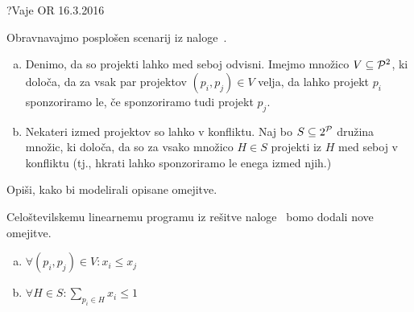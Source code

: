 \begin{naloga}{?}{Vaje OR 16.3.2016}
\begin{vprasanje}[proj2]
Obravnavajmo posplošen scenarij iz naloge~.
\begin{enumerate}[(a)]
\item Denimo, da so projekti lahko med seboj odvisni.
Imejmo množico $V \subseteq \mathcal{P}^2$, ki določa,
da za vsak par projektov $(p_i, p_j) \in V$ velja,
da lahko projekt $p_i$ sponzoriramo le,
če sponzoriramo tudi projekt $p_j$.

\item Nekateri izmed projektov so lahko v konfliktu.
Naj bo $S \subseteq 2^{\mathcal{P}}$ družina množic, ki določa,
da so za vsako množico $H \in S$ projekti iz $H$ med seboj v konfliktu
(tj., hkrati lahko sponzoriramo le enega izmed njih.)
\end{enumerate}
Opiši, kako bi modelirali opisane omejitve.
\end{vprasanje}

\begin{odgovor}
Celoštevilskemu linearnemu programu iz rešitve naloge~
bomo dodali nove omejitve.
\begin{enumerate}[(a)]
\item $\displaystyle \forall (p_i, p_j) \in V : x_i \le x_j$
\item $\displaystyle \forall H \in S : \sum_{p_i \in H} x_i \le 1$
\end{enumerate}
\end{odgovor}
\end{naloga}


